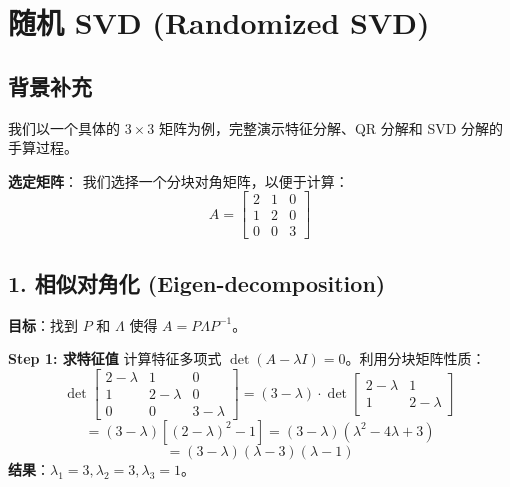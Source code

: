 \documentclass[11pt,a4paper]{ctexart}
\theoremstyle{definition}
\theoremstyle{remark}
\begin{document}
\section{随机 SVD (Randomized SVD)}

\subsection{背景补充}

我们以一个具体的 $3 \times 3$ 矩阵为例，完整演示特征分解、QR 分解和 SVD 分解的手算过程。

\textbf{选定矩阵}：
我们选择一个分块对角矩阵，以便于计算：
\[
A = \begin{bmatrix}
2 & 1 & 0 \\
1 & 2 & 0 \\
0 & 0 & 3
\end{bmatrix}
\]

\subsection{1. 相似对角化 (Eigen-decomposition)}
\textbf{目标}：找到 $P$ 和 $\Lambda$ 使得 $A = P \Lambda P^{-1}$。

\textbf{Step 1: 求特征值}
计算特征多项式 $\det(A - \lambda I) = 0$。利用分块矩阵性质：
\[
\det \begin{bmatrix} 2-\lambda & 1 & 0 \\ 1 & 2-\lambda & 0 \\ 0 & 0 & 3-\lambda \end{bmatrix}
= (3-\lambda) \cdot \det \begin{bmatrix} 2-\lambda & 1 \\ 1 & 2-\lambda \end{bmatrix}
\]
\[
= (3-\lambda) [ (2-\lambda)^2 - 1 ] = (3-\lambda)(\lambda^2 - 4\lambda + 3)
\]
\[
= (3-\lambda)(\lambda-3)(\lambda-1)
\]
\textbf{结果}：$\lambda_1 = 3, \lambda_2 = 3, \lambda_3 = 1$。
\end{document}

